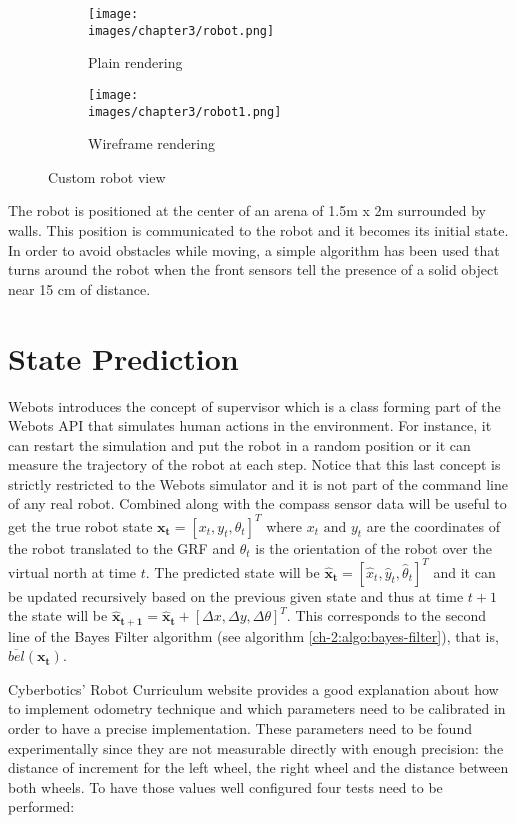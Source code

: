 \begin{figure}[h!]
  \centering
  \begin{subfigure}[b]{0.41\linewidth}
  	\texttt{[image: \\images/chapter3/robot.png]}
	\caption{Plain rendering}
  	\label{fig:ch-3:robot-1}
  \end{subfigure}
  \begin{subfigure}[b]{0.4\linewidth}
  	\texttt{[image: \\images/chapter3/robot1.png]}
	\caption{Wireframe rendering}
  	\label{fig:ch-3:robot-2}
  \end{subfigure}
  \caption{Custom robot view}
  \label{fig:ch-3:robot-view}
\end{figure}

The robot is positioned at the center of an arena of 1.5m x 2m surrounded by walls. This position is communicated to the robot and it becomes its initial state. In order to avoid obstacles while moving, a simple algorithm has been used that turns around the robot when the front sensors tell the presence of a solid object near 15 cm of distance.

\section{State Prediction}

Webots introduces the concept of supervisor which is a class forming part of the Webots API that simulates human actions in the environment. For instance, it can restart the simulation and put the robot in a random position or it can measure the trajectory of the robot at each step. Notice that this last concept is strictly restricted to the Webots simulator and it is not part of the command line of any real robot. Combined along with the compass sensor data will be useful to get the true robot state $\mathbf{x_t} = [x_t, y_t, \theta_t]^T$ where $x_t \text{ and } y_t$ are the coordinates of the robot translated to the GRF and $\theta_t$ is the orientation of the robot over the virtual north at time $t$. The predicted state will be $\mathbf{\hat{x}_{t}} = [\hat{x}_t, \hat{y}_t, \hat{\theta}_t]^T$ and it can be updated recursively based on the previous given state and thus at time $t+1$ the state will be $\mathbf{\hat{x}_{t+1}} = \mathbf{\hat{x}_{t}} + [\Delta x, \Delta y, \Delta \theta]^T$. This corresponds to the second line of the Bayes Filter algorithm (see algorithm \ref{ch-2:algo:bayes-filter}), that is, $\overline{bel}(\mathbf{x_t})$.

Cyberbotics' Robot Curriculum website\cite{webots-curri-odometry} provides a good explanation about how to implement odometry technique and which parameters need to be calibrated in order to have a precise implementation. These parameters need to be found experimentally since they are not measurable directly with enough precision: the distance of increment for the left wheel, the right wheel and the distance between both wheels. To have those values well configured four tests need to be performed:

